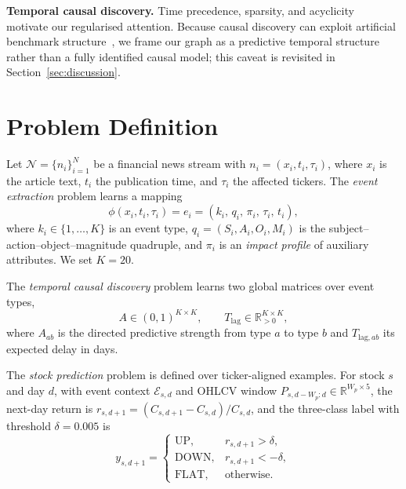 \documentclass[sigconf,nonacm]{acmart}
\begin{document}
\textbf{Temporal causal discovery.}
Time precedence, sparsity, and acyclicity~\cite{granger,nauta,tank,notears}
motivate our regularised attention. Because causal discovery can exploit
artificial benchmark structure~\cite{reisach}, we frame our graph as a
predictive temporal structure rather than a fully identified causal
model; this caveat is revisited in Section~\ref{sec:discussion}.

\section{Problem Definition}
Let $\mathcal{N}=\{n_i\}_{i=1}^{N}$ be a financial news stream with
$n_i=(x_i,t_i,\tau_i)$, where $x_i$ is the article text, $t_i$ the
publication time, and $\tau_i$ the affected tickers. The
\emph{event extraction} problem learns a mapping
\begin{equation}
\phi(x_i,t_i,\tau_i)=e_i=(k_i,\,q_i,\,\pi_i,\,\tau_i,\,t_i),
\end{equation}
where $k_i\in\{1,\dots,K\}$ is an event type, $q_i=(S_i,A_i,O_i,M_i)$ is
the subject--action--object--magnitude quadruple, and $\pi_i$ is an
\emph{impact profile} of auxiliary attributes. We set $K=20$.

The \emph{temporal causal discovery} problem learns two global matrices
over event types,
\begin{equation}
A\in(0,1)^{K\times K},\qquad
T_{\mathrm{lag}}\in\mathbb{R}_{>0}^{K\times K},
\end{equation}
where $A_{ab}$ is the directed predictive strength from type $a$ to type
$b$ and $T_{\mathrm{lag},ab}$ its expected delay in days.

The \emph{stock prediction} problem is defined over ticker-aligned
examples. For stock $s$ and day $d$, with event context
$\mathcal{E}_{s,d}$ and OHLCV window $P_{s,d-W_p:d}\in\mathbb{R}^{W_p\times5}$,
the next-day return is
$r_{s,d+1}=(C_{s,d+1}-C_{s,d})/C_{s,d}$, and the three-class label with
threshold $\delta=0.005$ is
\begin{equation}
y_{s,d+1}=
\begin{cases}
\mathrm{UP}, & r_{s,d+1}>\delta,\\
\mathrm{DOWN}, & r_{s,d+1}<-\delta,\\
\mathrm{FLAT}, & \text{otherwise}.
\end{cases}
\end{equation}

\end{document}
